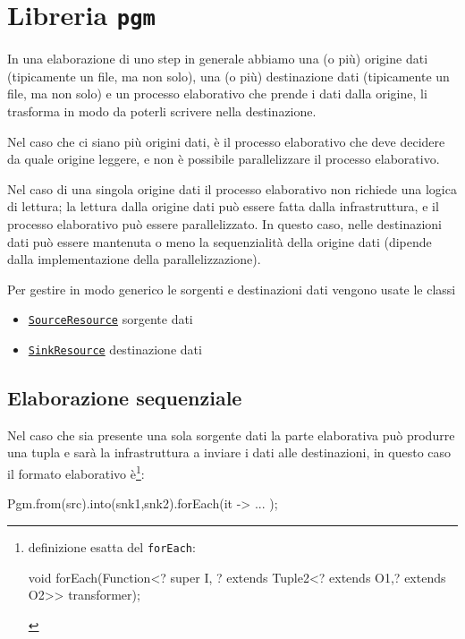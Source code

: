 \chapter{Libreria \texttt{pgm}}

In una elaborazione di uno step in generale abbiamo una (o più) origine dati
(tipicamente un file, ma non solo), una (o più) destinazione dati (tipicamente
un file, ma non solo) e un processo elaborativo che prende i dati dalla origine,
li trasforma in modo da poterli scrivere nella destinazione.

Nel caso che ci siano più origini dati, è il processo elaborativo che deve
decidere da quale origine leggere, e non è possibile parallelizzare il processo
elaborativo.

Nel caso di una singola origine dati il processo elaborativo non richiede una
logica di lettura; la lettura dalla origine dati può essere fatta dalla
infrastruttura, e il processo elaborativo può essere parallelizzato.
In questo caso, nelle destinazioni dati può essere mantenuta o meno la
sequenzialità della origine dati (dipende dalla implementazione della
parallelizzazione).

Per gestire in modo generico le sorgenti e destinazioni dati vengono usate le
classi
\begin{itemize}
    \item \hyperref[sec:srcRes]{\texttt{SourceResource}} sorgente dati
    \item \hyperref[sec:snkRes]{\texttt{SinkResource}} destinazione dati
\end{itemize}

\section{Elaborazione sequenziale} \label{sec:exeSeq}

Nel caso che sia presente una sola sorgente dati la parte elaborativa può
produrre una tupla e sarà la infrastruttura a inviare i dati alle destinazioni,
in questo caso il formato elaborativo è\footnote{%
    definizione esatta del \texttt{forEach}:
    \begin{javacode}
    void forEach(Function<? super I, ? extends Tuple2<? extends O1,? extends O2>> transformer);
    \end{javacode}
}:
\begin{elisting}[!htb]
\begin{javacode}
    Pgm.from(src).into(snk1,snk2).forEach(it -> { ... });
\end{javacode}
\caption{elaborazione $1\mapsto N$}
\label{lst:processTuple}
\end{elisting}


